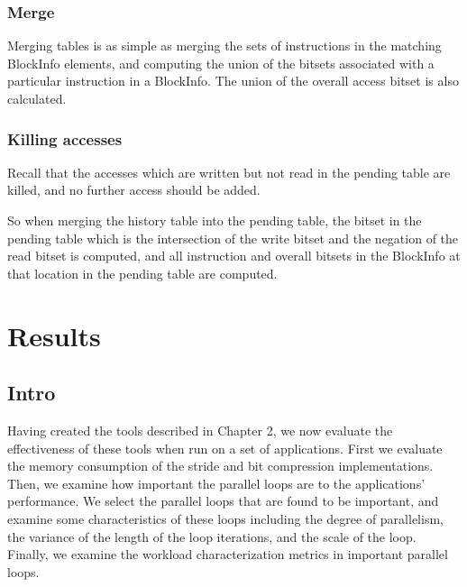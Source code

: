 \documentclass[12pt,twoside]{reedthesis}
\begin{document}
			
			\subsection{Merge}
			
			Merging tables is as simple as merging the sets of instructions in the matching BlockInfo elements, and computing the union of the bitsets associated with a particular instruction in a BlockInfo. The union of the overall access bitset is also calculated. 
			
			\subsection{Killing accesses}
			
			Recall that the accesses which are written but not read in the pending table are killed, and no further access should be added.
			
			
			So when merging the history table into the pending table, the bitset in the pending table which is the intersection of the write bitset and the negation of the read bitset is computed, and all instruction and overall bitsets in the BlockInfo at that location in the pending table are computed. 
			
\chapter{Results}
	
		\section{Intro}
	
		Having created the tools described in Chapter 2, we now evaluate the effectiveness of these tools when run on a set of applications. First we evaluate the memory consumption of the stride and bit compression implementations. Then, we examine how important the parallel loops are to the applications' performance. We select the parallel loops that are found to be important, and examine some characteristics of these loops including the degree of parallelism, the variance of the length of the loop iterations, and the scale of the loop. Finally, we examine the workload characterization metrics in important parallel loops. 
		
\end{document}
